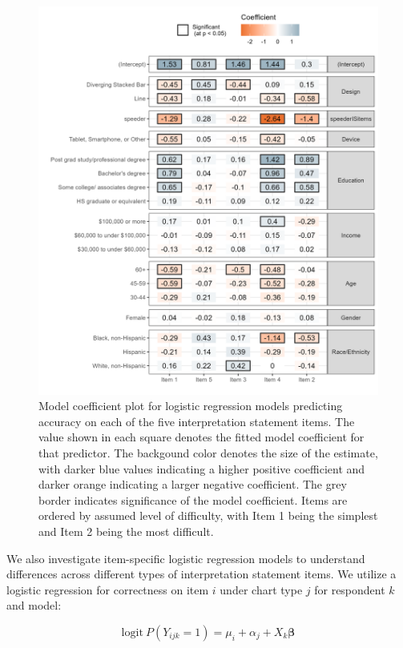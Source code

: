\documentclass{IEEEcsmag}
\begin{document}
\begin{figure}




\includegraphics[width=36pc]{images/itemaccuracy.png}
\caption{Model coefficient plot for logistic regression models predicting accuracy on each of the five interpretation statement items. The value shown in each square denotes the fitted model coefficient for that predictor. The backgound color denotes the size of the estimate, with darker blue values indicating a higher positive coefficient and darker orange indicating a larger negative coefficient. The grey border indicates significance of the model coefficient. Items are ordered by assumed level of difficulty, with Item 1 being the simplest and Item 2 being the most difficult.}

\end{figure}

We also investigate item-specific logistic regression models to understand differences across different types of interpretation statement items. We utilize a logistic regression for correctness on item \(i\) under chart type \(j\) for respondent \(k\) and model:

\begin{equation}
\mbox{logit}\ P(Y_{ijk} = 1) = \mu_i + \alpha_j + X_k\mathbf{\beta}
\end{equation}
\end{document}
